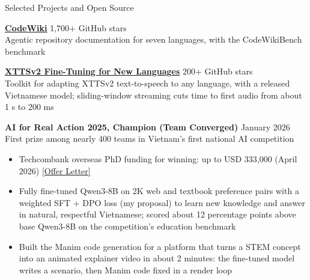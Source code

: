 \documentclass{resume} %
\begin{document}
\begin{rSection}{Selected Projects and Open Source}

\textbf{\href{https://github.com/FSoft-AI4Code/CodeWiki}{CodeWiki}}
\hfill 1,700+ GitHub stars\\
Agentic repository documentation for seven languages, with the CodeWikiBench benchmark

\vspace{0.15em}

\textbf{\href{https://github.com/anhnh2002/XTTSv2-Finetuning-for-New-Languages}
{XTTSv2 Fine-Tuning for New Languages}}
\hfill 200+ GitHub stars\\
Toolkit for adapting XTTSv2 text-to-speech to any language, with a released Vietnamese
model; sliding-window streaming cuts time to first audio from about 1 s to 200 ms

\vspace{0.15em}

\textbf{AI for Real Action 2025, Champion (Team Converged)}
\hfill January 2026\\
First prize among nearly 400 teams in Vietnam's first national AI competition

\begin{itemize}[leftmargin=1.5em,itemsep=0em,topsep=0.1em]
    \ifdefined\nophdfunding\else
    \item Techcombank overseas PhD funding for winning: up to USD 333,000
    (April 2026)
    \href{https://anhnh2002.github.io/Letter_of_Offer_N.H.Anh.pdf}{[Offer Letter]}
    \fi
    \item Fully fine-tuned Qwen3-8B on 2K web and textbook preference pairs with a
    weighted SFT + DPO loss (my proposal) to learn new knowledge and answer in
    natural, respectful Vietnamese; scored about 12 percentage points above base
    Qwen3-8B on the competition's education benchmark
    \item Built the Manim code generation for a platform that turns a STEM concept
    into an animated explainer video in about 2 minutes: the fine-tuned model
    writes a scenario, then Manim code fixed in a render loop
\end{itemize}

\end{rSection}

\end{document}
